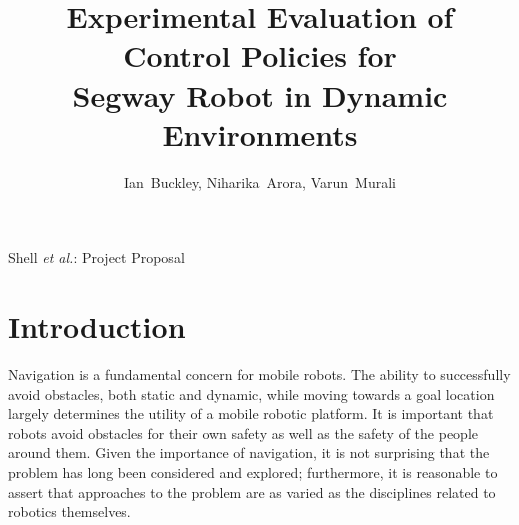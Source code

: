 \documentclass[journal]{IEEEtran}
\begin{document}
\title{Experimental Evaluation of Control Policies for \\Segway Robot in Dynamic Environments }
\author{Ian~Buckley, Niharika~Arora, Varun~Murali}
{Shell \MakeLowercase{\textit{et al.}}: Project Proposal}
\maketitle

\begin{abstract}
\end{abstract}

\section{Introduction}
Navigation is a fundamental concern for mobile robots. The ability to successfully avoid obstacles, both static and dynamic, while moving towards a goal location largely determines the utility of a mobile robotic platform. It is important that robots avoid obstacles for their own safety as well as the safety of the people around them. Given the importance of navigation, it is not surprising that the problem has long been considered and explored; furthermore, it is reasonable to assert that approaches to the problem are as varied as the disciplines related to robotics themselves.  
\end{document}
